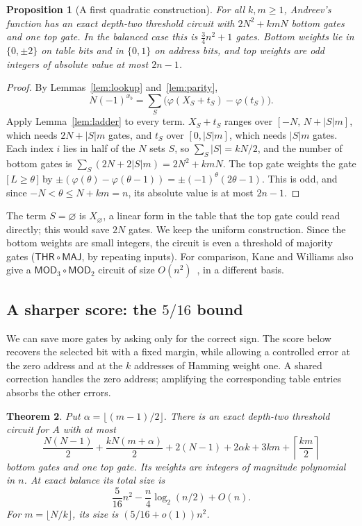 \documentclass[11pt,letterpaper]{article}
\newtheorem{theorem}{Theorem}
\newtheorem{proposition}[theorem]{Proposition}
\theoremstyle{remark}
\newcommand{\ind}[1]{\bigl[\,#1\,\bigr]}
\newcommand{\subsect}[1]{\subsection*{\texorpdfstring{\color{ink}#1}{#1}}}
\newcommand{\THR}{\mathsf{THR}}
\begin{document}
\begin{proposition}[A first quadratic construction]\label{prop:basic}
For all $k,m\ge1$, Andreev's function has an exact depth-two threshold
circuit with $2N^2+kmN$ bottom gates and one top gate. In the balanced case
this is $\tfrac34n^2+1$ gates. Bottom weights lie in $\{0,\pm2\}$ on table
bits and in $\{0,1\}$ on address bits, and
top weights are odd integers of absolute value at most $2n-1$.
\end{proposition}
\begin{proof}
By Lemmas~\ref{lem:lookup} and~\ref{lem:parity},
\[
N(-1)^{x_b}=\sum_S\bigl(\varphi(X_S+t_S)-\varphi(t_S)\bigr).
\]
Apply Lemma~\ref{lem:ladder} to every term. $X_S+t_S$ ranges over
$[-N,\,N+|S|m]$, which needs $2N+|S|m$ gates, and $t_S$ over $[0,|S|m]$,
which needs $|S|m$ gates. Each index $i$ lies in half of the $N$ sets $S$,
so $\sum_S|S|=kN/2$, and the number of bottom gates is
$\sum_S(2N+2|S|m)=2N^2+kmN$. The top gate weights the gate
$\ind{L\ge\theta}$ by $\pm(\varphi(\theta)-\varphi(\theta-1))=\pm(-1)^\theta(2\theta-1)$.
This is odd, and since $-N<\theta\le N+km=n$, its absolute value is at most
$2n-1$.
\end{proof}
The term $S=\varnothing$ is $X_\varnothing$, a linear form in the table that the
top gate could read directly; this would save $2N$ gates. We keep the uniform
construction.
Since the bottom weights are small integers, the circuit is even a threshold
of majority gates ($\THR\circ\mathsf{MAJ}$, by repeating inputs). For
comparison, Kane and Williams also give a $\mathsf{MOD}_3\circ\mathsf{MOD}_2$
circuit of size $O(n^2)$~\cite[Thm.~1.2]{KW}, in a different basis.

\subsect{A sharper score: the \texorpdfstring{$5/16$}{5/16} bound}

We can save more gates by asking only for the correct sign. The score below
recovers the selected bit with a fixed margin, while allowing a controlled
error at the zero address and at the $k$ addresses of Hamming weight one.
A shared correction handles the zero address; amplifying the corresponding
table entries absorbs the other errors.

\begin{theorem}\label{thm:exact}
Put $\alpha=\lfloor(m-1)/2\rfloor$. There is an exact depth-two threshold
circuit for $A$ with at most
\begin{equation}\label{eq:bestcount}
\frac{N(N-1)}2+\frac{kN(m+\alpha)}2
 +2(N-1)+2\alpha k+3km+\left\lceil\frac{km}{2}\right\rceil
\end{equation}
bottom gates and one top gate. Its weights are integers of magnitude
polynomial in $n$. At exact balance its total size is
\[
\frac5{16}n^2-\frac n4\log_2(n/2)+O(n).
\]
For $m=\lfloor N/k\rfloor$, its size is $(5/16+o(1))n^2$.
\end{theorem}
\end{document}
